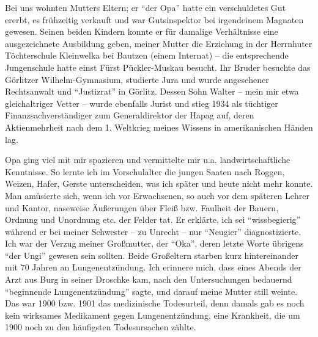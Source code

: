 Bei uns wohnten Mutters Eltern; er \enquote{der Opa} hatte ein verschuldetes Gut ererbt, es frühzeitig verkauft und war Gutsinspektor bei irgendeinem Magnaten gewesen. Seinen beiden Kindern konnte er für damalige Verhältnisse eine ausgezeichnete Ausbildung geben, meiner Mutter die Erziehung in der Herrnhuter Töchterschule Kleinwelka bei Bautzen (einem Internat) -- die entsprechende Jungenschule hatte einst Fürst Pückler-Muskau besucht. Ihr Bruder besuchte das Görlitzer Wilhelm-Gymnasium, studierte Jura und wurde angesehener Rechtsanwalt und \enquote{Justizrat} in Görlitz. Dessen Sohn Walter -- mein mir etwa gleichaltriger Vetter -- wurde ebenfalls Jurist und stieg 1934 als tüchtiger Finanzsachverständiger zum Generaldirektor der Hapag auf, deren Aktienmehrheit nach dem 1. Weltkrieg meines Wissens in amerikanischen Händen lag.

Opa ging viel mit mir spazieren und vermittelte mir u.a. landwirtschaftliche Kenntnisse. So lernte ich im Vorschulalter die jungen Saaten nach Roggen, Weizen, Hafer, Gerste unterscheiden, was ich später und heute nicht mehr konnte. Man amüsierte sich, wenn ich vor Erwachsenen, so auch vor dem späteren Lehrer und Kantor, naseweise Äußerungen über Fleiß bzw. Faulheit der Bauern, Ordnung und Unordnung etc. der Felder tat. Er erklärte, ich sei \enquote{wissbegierig} während er bei meiner Schwester -- zu Unrecht -- nur \enquote{Neugier} diagnostizierte. Ich war der Verzug meiner Großmutter, der \enquote{Oka}, deren letzte Worte übrigens \enquote{der Ungi} gewesen sein sollten. Beide Großeltern starben kurz hintereinander mit 70 Jahren an Lungenentzündung. Ich erinnere mich, dass eines Abends der Arzt aus Burg in seiner Droschke kam, nach den Untersuchungen bedauernd \enquote{beginnende Lungenentzündung} sagte, und darauf meine Mutter still weinte. Das war 1900 bzw. 1901 das medizinische Todesurteil, denn damals gab es noch kein wirksames Medikament gegen Lungenentzündung, eine Krankheit, die um 1900 noch zu den häufigsten Todesursachen zählte.

